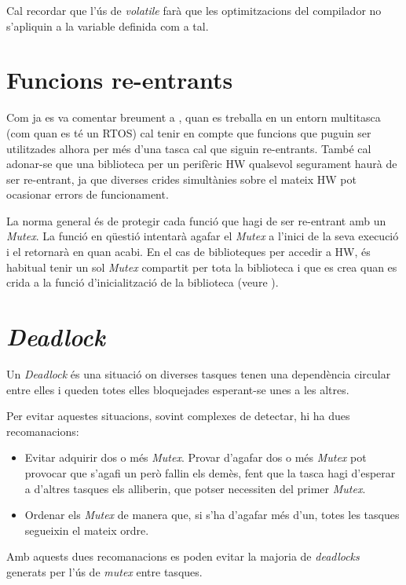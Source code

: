 Cal recordar que l'ús de {\em volatile} farà que les optimitzacions del compilador no s'apliquin a la variable definida com a tal.

\section{Funcions re-entrants}
Com ja es va comentar breument a , quan es treballa en un entorn multitasca (com quan es té un RTOS) cal tenir en compte que funcions que puguin ser utilitzades alhora per més d'una tasca cal que siguin re-entrants. També cal adonar-se que una biblioteca per un perifèric HW qualsevol segurament haurà de ser re-entrant, ja que diverses crides simultànies sobre el mateix HW pot ocasionar errors de funcionament.

La norma general és de protegir cada funció que hagi de ser re-entrant amb un {\em Mutex}. La funció en qüestió intentarà agafar el {\em Mutex} a l'inici de la seva execució i el retornarà en quan acabi. En el cas de biblioteques per accedir a HW, és habitual tenir un sol {\em Mutex} compartit per tota la biblioteca i que es crea quan es crida a la funció d'inicialització de la biblioteca (veure ).

\section{\em Deadlock}
Un {\em Deadlock} és una situació on diverses tasques tenen una dependència circular entre elles i queden totes elles bloquejades esperant-se unes a les altres.

Per evitar aquestes situacions, sovint complexes de detectar, hi ha dues recomanacions:
\begin{itemize}
 \item Evitar adquirir dos o més {\em Mutex}. Provar d'agafar dos o més {\em Mutex} pot provocar que s'agafi un però fallin els demès, fent que la tasca hagi d'esperar a d'altres tasques els alliberin, que potser necessiten del primer {\em Mutex}.
 \item Ordenar els {\em Mutex} de manera que, si s'ha d'agafar més d'un, totes les tasques segueixin el mateix ordre.
\end{itemize}

Amb aquests dues recomanacions es poden evitar la majoria de {\em deadlocks} generats per l'ús de {\em mutex} entre tasques.

